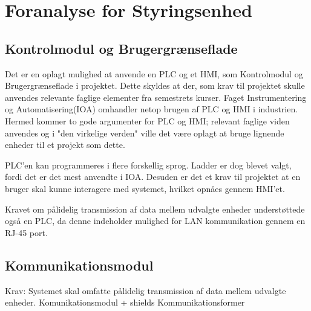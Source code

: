 
\section{Foranalyse for Styringsenhed}

\subsection{Kontrolmodul og Brugergrænseflade}
Det er en oplagt mulighed at anvende en PLC og et HMI, som Kontrolmodul og Brugergrænseflade i projektet. Dette skyldes at der, som krav til projektet skulle anvendes relevante faglige elementer fra semestrets kurser. Faget Instrumentering og Automatisering(IOA) omhandler netop brugen af PLC og HMI i industrien. Hermed kommer to gode argumenter for PLC og HMI; relevant faglige viden anvendes og i "den virkelige verden" ville det være oplagt at bruge lignende enheder til et projekt som dette.

PLC'en kan programmeres i flere forskellig sprog. Ladder er dog blevet valgt, fordi det er det mest anvendte i IOA. Desuden er det et krav til projektet at en bruger skal kunne interagere med systemet, hvilket opnåes gennem HMI'et.

Kravet om pålidelig transmission af data mellem udvalgte enheder understøttede også en PLC, da denne indeholder mulighed for LAN kommunikation gennem en RJ-45 port.

\subsection{Kommunikationsmodul}
Krav: Systemet skal omfatte pålidelig transmission af data mellem udvalgte enheder.
Komunikationsmodul + shields
Kommunikationsformer

